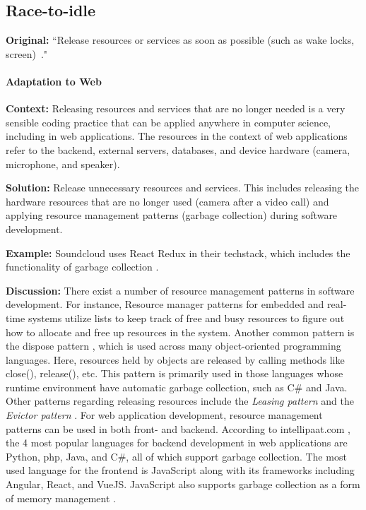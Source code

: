 

\subsection{Race-to-idle}\label{sec:patterns-RaceToIdle}
\textbf{Original:} ``Release resources or services as soon as possible (such as wake locks, screen)~\cite{cruz2019catalog}."

\paragraph{Adaptation to Web}\mbox{}

\textbf{Context:} Releasing resources and services that are no longer needed is a very sensible coding practice that can be applied anywhere in computer science, including in web applications. The resources in the context of web applications refer to the backend, external servers, databases, and device hardware (\eg camera, microphone, and speaker).

\textbf{Solution:} Release unnecessary resources and services. This includes releasing the hardware resources that are no longer used (\eg camera after a video call) and applying resource management patterns (\eg garbage collection) during software development.

\textbf{Example:} Soundcloud uses React Redux in their techstack, which includes the functionality of garbage collection \cite{Garbagecollect}.

\textbf{Discussion:} There exist a number of resource management patterns in software development. For instance, Resource manager patterns \cite{design-pattern-resource-manager} for embedded and real-time systems utilize lists to keep track of free and busy resources to figure out how to allocate and free up resources in the system. Another common pattern is the dispose pattern \cite{wikipedia_dispose_pattern}, which is used across many object-oriented programming languages. Here, resources held by objects are released by calling methods like close(), release(), etc. This pattern is primarily used in those languages whose runtime environment have automatic garbage collection, such as C\# and Java. Other patterns regarding releasing resources include the \emph{Leasing pattern} and the \emph{Evictor pattern} \cite{resource-manager-patterns}.
For web application development, resource management patterns can be used in both front- and backend. According to intellipaat.com \cite{best-web-dev-languages}, the 4 most popular languages for backend development in web applications are Python, php, Java, and C\#, all of which support garbage collection. The most used language for the frontend is JavaScript along with its frameworks including Angular, React, and VueJS. JavaScript also supports garbage collection as a form of memory management \cite{dev_mozilla_memory_management}.

